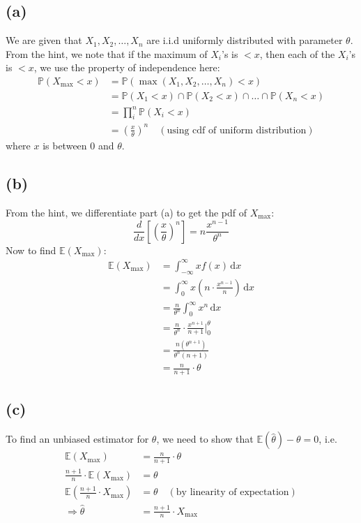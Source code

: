 \documentclass[12pt]{article}
\begin{document}
\subsection*{(a)}
We are given that $X_{1}, X_{2}, \dots, X_n$ are i.i.d uniformly distributed with parameter $\theta$. From the hint, we note that if the maximum of $X_i$'s is $<x$, then each of the $X_i$'s is $<x$, we use the property of independence here: \begin{align*}
    \mathbb{P}(X_{\text{max}}<x) &= \mathbb{P}(\max (X_{1}, X_{2}, \dots, X_n) < x) \\ 
    &= \mathbb{P}(X_{1} < x) \cap \mathbb{P}(X_{2} < x) \cap \dots \cap \mathbb{P}(X_n < x) \\ 
    &= \prod_i^{n} \mathbb{P}(X_i <x) \\ 
    &= \boxed{\left( \frac{x}{\theta} \right)^{n}} \quad (\text{using cdf of uniform distribution})
\end{align*} where $x$ is between 0 and $\theta$.

\subsection*{(b)}
From the hint, we differentiate part (a) to get the pdf of $X_\text{max}$: \begin{equation*}
    \frac{d}{dx}\left[ \left( \frac{x}{\theta} \right)^{n} \right] = n \frac{x^{n-1}}{\theta^{n}}
\end{equation*} Now to find $ \mathbb{E}(X_\text{max})$: \begin{align*}
    \mathbb{E}(X_\text{max}) &= \int_{-\infty}^{\infty} xf(x) \, \mathrm{d}x \\ 
    &= \int_{0}^{\infty} x \left( n \cdot \frac{x^{n-1}}{n} \right) \, \mathrm{d}x \\ 
    &= \frac{n}{\theta^{n}} \int_{0}^{\infty} x^{n} \, \mathrm{d}x \\ 
    &= \frac{n}{\theta^{n}} \cdot \frac{x^{n+1}}{n+1} \Biggr |_0^{\theta} \\ 
    &= \frac{n(\theta^{n+1})}{\theta^{n}(n+1)} \\ 
    &= \boxed{\frac{n}{n+1} \cdot \theta}
\end{align*}

\subsection*{(c)}

To find an unbiased estimator for $\theta$, we need to show that $ \mathbb{E}(\hat{\theta}) - \theta = 0$, i.e. \begin{align*}
    \mathbb{E}(X_\text{max}) &= \frac{n}{n+1} \cdot \theta \\ 
    \frac{n+1}{n} \cdot \mathbb{E}(X_\text{max}) &= \theta \\ 
    \mathbb{E}\left( \frac{n+1}{n} \cdot X_\text{max}\right) &= \theta \quad (\text{by linearity of expectation}) \\ 
    \Rightarrow \hat{\theta} &= \boxed{\frac{n+1}{n} \cdot X_\text{max}}
\end{align*}
\end{document}
